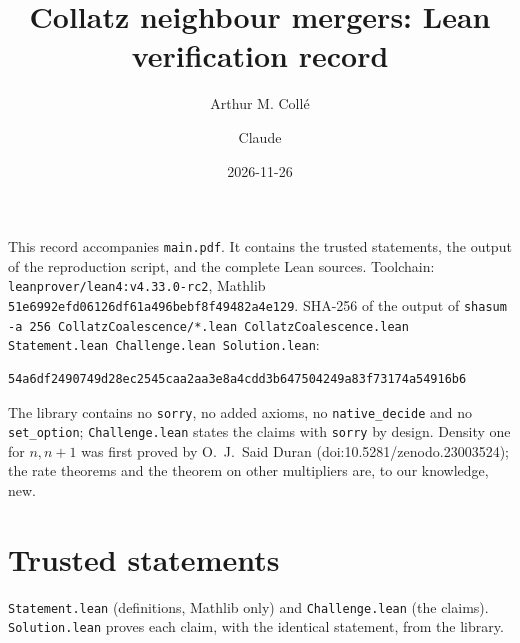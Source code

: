 \documentclass[10pt]{article}
\title{Collatz neighbour mergers: Lean verification record}
\author{Arthur M. Coll\'e \and Claude}
\date{2026-11-26}
\begin{document}
\maketitle
\noindent This record accompanies \texttt{main.pdf}. It contains the trusted statements, the output of the
reproduction script, and the complete Lean sources. Toolchain: \texttt{leanprover/lean4:v4.33.0-rc2}, Mathlib
\texttt{51e6992efd06126df61a496bebf8f49482a4e129}. SHA-256 of the output of
\texttt{shasum -a 256 CollatzCoalescence/*.lean CollatzCoalescence.lean Statement.lean Challenge.lean Solution.lean}:
\begin{Verbatim}
54a6df2490749d28ec2545caa2aa3e8a4cdd3b647504249a83f73174a54916b6
\end{Verbatim}
The library contains no \texttt{sorry}, no added axioms, no \texttt{native\_decide} and no \texttt{set\_option};
\texttt{Challenge.lean} states the claims with \texttt{sorry} by design. Density one for $n,n+1$ was first proved by
O.~J.~Said Duran (doi:10.5281/zenodo.23003524); the rate theorems and the theorem on other multipliers are, to our knowledge, new.

\section{Trusted statements}
\texttt{Statement.lean} (definitions, Mathlib only) and \texttt{Challenge.lean} (the claims). \texttt{Solution.lean}
proves each claim, with the identical statement, from the library.
\end{document}

